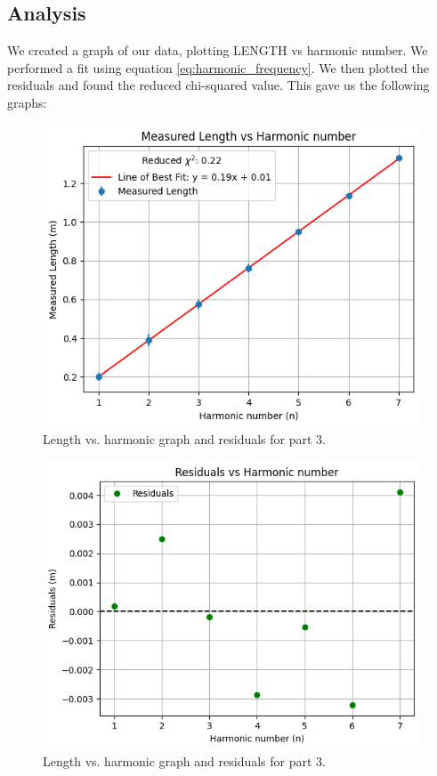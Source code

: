\documentclass[11pt]{article}
\begin{document}
    \subsection{Analysis}\label{subsec:part_3_analysis}
    We created a graph of our data, plotting LENGTH vs harmonic number.
    We performed a fit using equation \ref{eq:harmonic_frequency}.
    We then plotted the residuals and found the reduced chi-squared value.
    This gave us the following graphs:

    \begin{figure}[H]
        \includegraphics[width=1\textwidth]{resources/images/p3 graph}
        \caption{Length vs. harmonic graph and residuals for part 3.}
        \label{fig:measured_length}
    \end{figure}

    \begin{figure}[H]
        \includegraphics[width=1\textwidth]{resources/images/p3 residuals}
        \caption{Length vs. harmonic graph and residuals for part 3.}
        \label{fig:measured_length_residuals}
    \end{figure}
\end{document}
